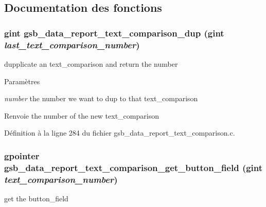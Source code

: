 \subsection{Documentation des fonctions}
\subsubsection[{gsb\_\-data\_\-report\_\-text\_\-comparison\_\-dup}]{\setlength{\rightskip}{0pt plus 5cm}gint gsb\_\-data\_\-report\_\-text\_\-comparison\_\-dup (gint {\em last\_\-text\_\-comparison\_\-number})}\label{gsb__data__report__text__comparison_8h_a995e026448bba945f24812332212fdf9}
dupplicate an text\_\-comparison and return the number


\begin{DoxyParams}{Paramètres}
\item[{\em number}]the number we want to dup to that text\_\-comparison\end{DoxyParams}
\begin{DoxyReturn}{Renvoie}
the number of the new text\_\-comparison 
\end{DoxyReturn}


Définition à la ligne 284 du fichier gsb\_\-data\_\-report\_\-text\_\-comparison.c.

\subsubsection[{gsb\_\-data\_\-report\_\-text\_\-comparison\_\-get\_\-button\_\-field}]{\setlength{\rightskip}{0pt plus 5cm}gpointer gsb\_\-data\_\-report\_\-text\_\-comparison\_\-get\_\-button\_\-field (gint {\em text\_\-comparison\_\-number})}\label{gsb__data__report__text__comparison_8h_a39245ed55201b9a0c7f4379f4354f5fa}
get the button\_\-field


